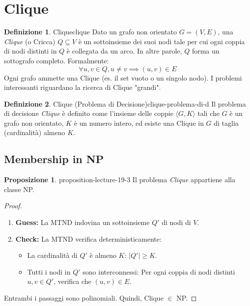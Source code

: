 \documentclass[a4paper]{article}
\theoremstyle{definition} %
\newtheorem{definition}{Definizione}[section]
\newtheorem{proposition}{Proposizione}[section]
\theoremstyle{definition} %
\begin{document}
\section{Clique}

\begin{definition}{Clique}{clique}
Dato un grafo non orientato $G=(V, E)$, una \emph{Clique} (o Cricca) $Q \subseteq V$ è un sottoinsieme dei suoi nodi tale per cui ogni coppia di nodi distinti in $Q$ è collegata da un arco. In altre parole, $Q$ forma un sottografo completo. Formalmente:
\[ \forall u, v \in Q, u \ne v \implies (u, v) \in E \]
Ogni grafo ammette una Clique (es. il set vuoto o un singolo nodo). I problemi interessanti riguardano la ricerca di Clique "grandi".
\end{definition}

\begin{definition}{Clique (Problema di Decisione)}{clique-problema-di-d}
Il problema di decisione \emph{Clique} è definito come l'insieme delle coppie $\langle G, K \rangle$ tali che $G$ è un grafo non orientato, $K$ è un numero intero, ed esiste una Clique in $G$ di taglia (cardinalità) almeno $K$.
\end{definition}

\subsection{Membership in NP}

\begin{proposition}{}{{ proposition-lecture-19-3 }}
Il problema \emph{Clique} appartiene alla classe NP.
\end{proposition}

\begin{proof}
\begin{enumerate}
    \item \textbf{Guess:} La MTND indovina un sottoinsieme $Q'$ di nodi di $V$.
    \item \textbf{Check:} La MTND verifica deterministicamente:
    \begin{itemize}
        \item La cardinalità di $Q'$ è almeno $K$: $|Q'| \ge K$.
        \item Tutti i nodi in $Q'$ sono interconnessi: Per ogni coppia di nodi distinti $u, v \in Q'$, verifica che $(u, v) \in E$.
    \end{itemize}
\end{enumerate}
Entrambi i passaggi sono polinomiali. Quindi, Clique $\in$ NP.
\end{proof}
\end{document}
